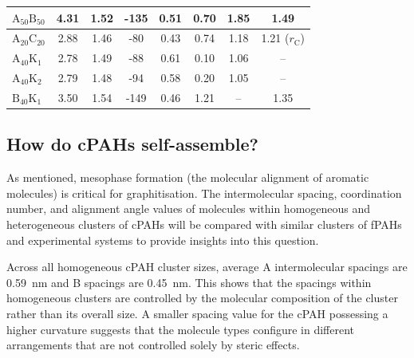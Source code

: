 \begin{table}[ht]
\begin{tabular}{lccccccc}
$\text{A}_{\text{50}}\text{B}_{\text{50}}$ & 4.31 & 1.52 & -135 & 0.51 & 0.70 & 1.85 & 1.49 \\ \hline
$\text{A}_{\text{20}}\text{C}_{\text{20}}$ & 2.88 & 1.46 & -80 & 0.43 & 0.74 & 1.18 & 1.21 ($r_{\text{C}}$) \\ \hline
$\text{A}_{\text{40}}\text{K}_{\text{1}}$ & 2.78 & 1.49 & -88 & 0.61 & 0.10 & 1.06 & -- \\
$\text{A}_{\text{40}}\text{K}_{\text{2}}$ & 2.79 & 1.48 & -94 & 0.58 & 0.20 & 1.05 & -- \\ 
$\text{B}_{\text{40}}\text{K}_{\text{1}}$ & 3.50 & 1.54 & -149 & 0.46 & 1.21 & -- & 1.35 \\ 
\end{tabular}
\end{table}
%

\subsection{How do cPAHs self-assemble?} 
As mentioned, mesophase formation (the molecular alignment of aromatic molecules) is critical for graphitisation. The intermolecular spacing, coordination number, and alignment angle values of molecules within homogeneous and heterogeneous clusters of cPAHs will be compared with similar clusters of fPAHs and experimental systems to provide insights into this question.

Across all homogeneous cPAH cluster sizes, average A intermolecular spacings are 0.59~nm and B spacings are 0.45~nm.  This shows that the spacings within homogeneous clusters are controlled by the molecular composition of the cluster rather than its overall size.  A smaller spacing value for the cPAH possessing a higher curvature suggests that the molecule types configure in different arrangements that are not controlled solely by steric effects. 

